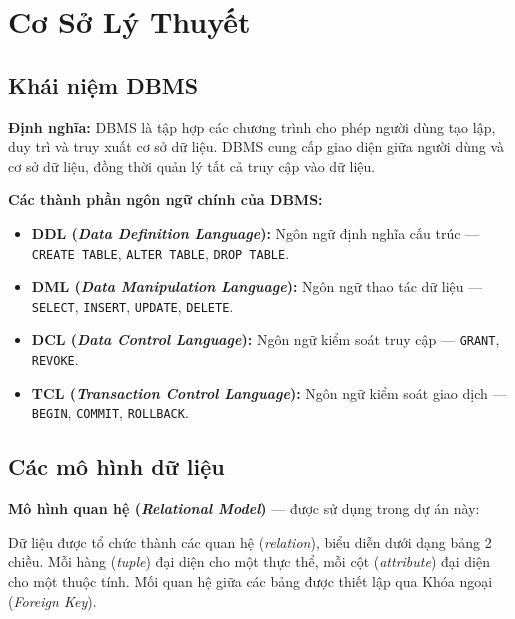 \documentclass[13pt, a4paper]{report}
\begin{document}
\chapter{Cơ Sở Lý Thuyết}

\section{Khái niệm DBMS}

\textbf{Định nghĩa:} DBMS là tập hợp các chương trình cho phép người dùng tạo lập, duy trì và truy xuất cơ sở dữ liệu. DBMS cung cấp giao diện giữa người dùng và cơ sở dữ liệu, đồng thời quản lý tất cả truy cập vào dữ liệu.

\textbf{Các thành phần ngôn ngữ chính của DBMS:}

\begin{itemize}[leftmargin=1.5cm]
  \item \textbf{DDL (\textit{Data Definition Language}):} Ngôn ngữ định nghĩa cấu trúc --- \lstinline[basicstyle=\ttfamily]{CREATE TABLE}, \lstinline[basicstyle=\ttfamily]{ALTER TABLE}, \lstinline[basicstyle=\ttfamily]{DROP TABLE}.
  \item \textbf{DML (\textit{Data Manipulation Language}):} Ngôn ngữ thao tác dữ liệu --- \lstinline[basicstyle=\ttfamily]{SELECT}, \lstinline[basicstyle=\ttfamily]{INSERT}, \lstinline[basicstyle=\ttfamily]{UPDATE}, \lstinline[basicstyle=\ttfamily]{DELETE}.
  \item \textbf{DCL (\textit{Data Control Language}):} Ngôn ngữ kiểm soát truy cập --- \lstinline[basicstyle=\ttfamily]{GRANT}, \lstinline[basicstyle=\ttfamily]{REVOKE}.
  \item \textbf{TCL (\textit{Transaction Control Language}):} Ngôn ngữ kiểm soát giao dịch --- \lstinline[basicstyle=\ttfamily]{BEGIN}, \lstinline[basicstyle=\ttfamily]{COMMIT}, \lstinline[basicstyle=\ttfamily]{ROLLBACK}.
\end{itemize}

\section{Các mô hình dữ liệu}

\textbf{Mô hình quan hệ (\textit{Relational Model})} --- được sử dụng trong dự án này:

Dữ liệu được tổ chức thành các quan hệ (\textit{relation}), biểu diễn dưới dạng bảng 2 chiều. Mỗi hàng (\textit{tuple}) đại diện cho một thực thể, mỗi cột (\textit{attribute}) đại diện cho một thuộc tính. Mối quan hệ giữa các bảng được thiết lập qua Khóa ngoại (\textit{Foreign Key}).
\end{document}
